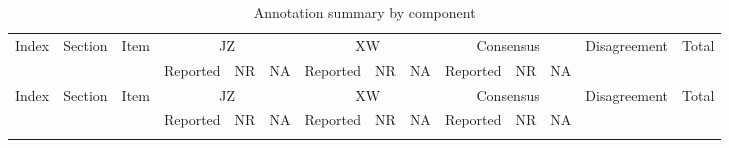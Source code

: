 

\begingroup
\fontsize{6}{7.5}\selectfont
\setlength{\tabcolsep}{1pt}
\begin{longtable}{@{}rll*{11}{r}@{}}
\caption{Annotation summary by component}
\label{tab:eval:component} \\

\toprule
Index & Section & Item & \multicolumn{3}{c}{JZ} & \multicolumn{3}{c}{XW} & \multicolumn{3}{c}{Consensus} & Disagreement & Total \\
\cmidrule(lr){4-6}\cmidrule(lr){7-9}\cmidrule(lr){10-12}
& & & Reported & NR & NA & Reported & NR & NA & Reported & NR & NA & & \\
\midrule
\endfirsthead

\toprule
Index & Section & Item & \multicolumn{3}{c}{JZ} & \multicolumn{3}{c}{XW} & \multicolumn{3}{c}{Consensus} & Disagreement & Total \\
\cmidrule(lr){4-6}\cmidrule(lr){7-9}\cmidrule(lr){10-12}
& & & Reported & NR & NA & Reported & NR & NA & Reported & NR & NA & & \\
\midrule
\endhead

\bottomrule
\endfoot


\end{longtable}
